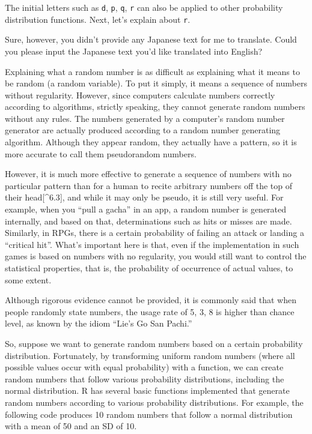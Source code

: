 \documentclass[
  a4paper,
]{book}
\begin{document}
The initial letters such as \texttt{d}, \texttt{p}, \texttt{q},
\texttt{r} can also be applied to other probability distribution
functions. Next, let's explain about \texttt{r}.

Sure, however, you didn't provide any Japanese text for me to translate.
Could you please input the Japanese text you'd like translated into
English?

Explaining what a random number is as difficult as explaining what it
means to be random (a random variable). To put it simply, it means a
sequence of numbers without regularity. However, since computers
calculate numbers correctly according to algorithms, strictly speaking,
they cannot generate random numbers without any rules. The numbers
generated by a computer's random number generator are actually produced
according to a random number generating algorithm. Although they appear
random, they actually have a pattern, so it is more accurate to call
them pseudorandom numbers.

However, it is much more effective to generate a sequence of numbers
with no particular pattern than for a human to recite arbitrary numbers
off the top of their head{[}\^{}6.3{]}, and while it may only be pseudo,
it is still very useful. For example, when you ``pull a gacha'' in an
app, a random number is generated internally, and based on that,
determinations such as hits or misses are made. Similarly, in RPGs,
there is a certain probability of failing an attack or landing a
``critical hit''. What's important here is that, even if the
implementation in such games is based on numbers with no regularity, you
would still want to control the statistical properties, that is, the
probability of occurrence of actual values, to some extent.

Although rigorous evidence cannot be provided, it is commonly said that
when people randomly state numbers, the usage rate of 5, 3, 8 is higher
than chance level, as known by the idiom ``Lie's Go San Pachi.''

So, suppose we want to generate random numbers based on a certain
probability distribution. Fortunately, by transforming uniform random
numbers (where all possible values occur with equal probability) with a
function, we can create random numbers that follow various probability
distributions, including the normal distribution. R has several basic
functions implemented that generate random numbers according to various
probability distributions. For example, the following code produces 10
random numbers that follow a normal distribution with a mean of 50 and
an SD of 10.
\end{document}
